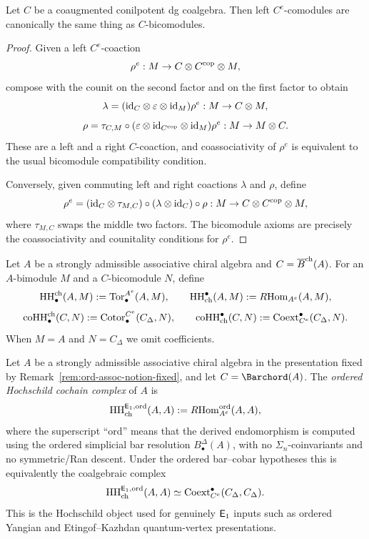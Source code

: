 \begin{lemma}
\ClaimStatusProvedHere
\label{lem:bicom-e}
Let $C$ be a coaugmented conilpotent dg coalgebra. Then left $C^e$-comodules are canonically the
same thing as $C$-bicomodules.
\end{lemma}

\begin{proof}
Given a left $C^e$-coaction
\[
\rho^e:M\to C\otimes C^{\mathrm{cop}}\otimes M,
\]
compose with the counit on the second factor and on the first factor to obtain
\[
\lambda=(\mathrm{id}_C\otimes \varepsilon\otimes \mathrm{id}_M)\rho^e:M\to C\otimes M,
\]
\[
\rho=\tau_{C,M}\circ(\varepsilon\otimes \mathrm{id}_{C^{\mathrm{cop}}}\otimes \mathrm{id}_M)\rho^e
:M\to M\otimes C.
\]
These are a left and a right $C$-coaction, and coassociativity of $\rho^e$ is equivalent to the
usual bicomodule compatibility condition.

Conversely, given commuting left and right coactions $\lambda$ and $\rho$, define
\[
\rho^e
=
(\mathrm{id}_C\otimes \tau_{M,C})\circ(\lambda\otimes \mathrm{id}_C)\circ \rho
:
M\to C\otimes C^{\mathrm{cop}}\otimes M,
\]
where $\tau_{M,C}$ swaps the middle two factors. The bicomodule axioms are precisely the
coassociativity and counitality conditions for $\rho^e$.
\end{proof}

\begin{definition}
Let $A$ be a strongly admissible associative chiral algebra and $C=\overline{B}^{\mathrm{ch}}(A)$.
For an $A$-bimodule $M$ and a $C$-bicomodule $N$, define
\[
\operatorname{HH}^{\mathrm{ch}}_\bullet(A,M):=\operatorname{Tor}_\bullet^{A^e}(A,M),
\qquad
\operatorname{HH}_{\mathrm{ch}}^\bullet(A,M):=R\!\operatorname{Hom}_{A^e}(A,M),
\]
\[
\operatorname{coHH}^{\mathrm{ch}}_\bullet(C,N):=\operatorname{Cotor}_\bullet^{C^e}(C_\Delta,N),
\qquad
\operatorname{coHH}_{\mathrm{ch}}^\bullet(C,N):=\operatorname{Coext}_{C^e}^\bullet(C_\Delta,N).
\]
When $M=A$ and $N=C_\Delta$ we omit coefficients.
\end{definition}

\begin{definition}
\label{def:ordered-hochschild-e1-input}
Let $A$ be a strongly admissible associative chiral algebra in the
presentation fixed by Remark~\ref{rem:ord-assoc-notion-fixed}, and
let $C=\Barchord(A)$.  The \emph{ordered Hochschild cochain complex}
of $A$ is
\[
\operatorname{HH}^{\mathsf{E}_1,\mathrm{ord}}_{\mathrm{ch}}(A,A)
:=
R\!\operatorname{Hom}_{A^e}^{\mathrm{ord}}(A,A),
\]
where the superscript ``ord'' means that the derived endomorphism is
computed using the ordered simplicial bar resolution
$B^\Delta_\bullet(A)$, with no $\Sigma_n$-coinvariants and no
symmetric/Ran descent.  Under the ordered bar--cobar hypotheses this
is equivalently the coalgebraic complex
\[
\operatorname{HH}^{\mathsf{E}_1,\mathrm{ord}}_{\mathrm{ch}}(A,A)
\simeq
\operatorname{Coext}_{C^e}^\bullet(C_\Delta,C_\Delta).
\]
This is the Hochschild object used for genuinely $\mathsf{E}_1$ inputs such
as ordered Yangian and Etingof--Kazhdan quantum-vertex presentations.
\end{definition}

